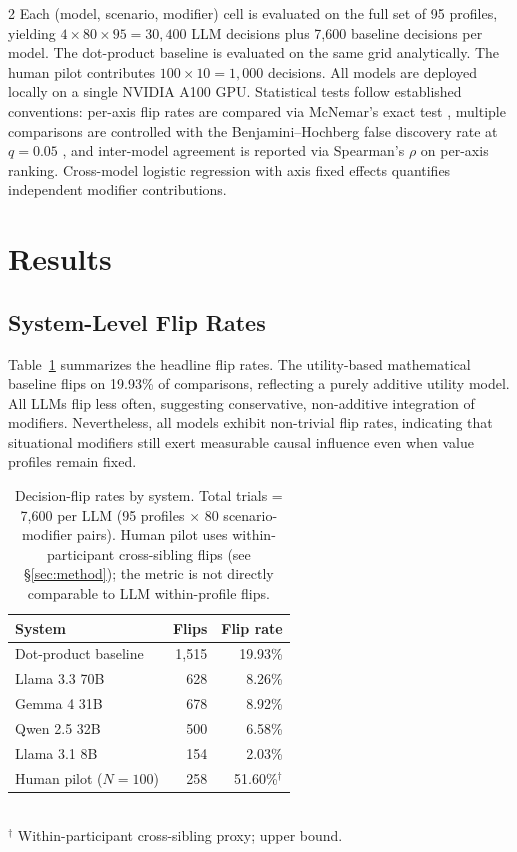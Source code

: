 \documentclass[11pt]{article}
\begin{document}
\begin{multicols}{2}
Each (model, scenario, modifier) cell is evaluated on the full set of 95 profiles, yielding $4\times80\times95 = 30{,}400$ LLM decisions plus 7{,}600 baseline decisions per model. The dot-product baseline is evaluated on the same grid analytically. The human pilot contributes $100\times10 = 1{,}000$ decisions. All models are deployed locally on a single NVIDIA A100 GPU. Statistical tests follow established conventions: per-axis flip rates are compared via McNemar's exact test \citep{mcnemar1947note}, multiple comparisons are controlled with the Benjamini--Hochberg false discovery rate at $q=0.05$ \citep{benjamini1995controlling}, and inter-model agreement is reported via Spearman's $\rho$ on per-axis ranking. Cross-model logistic regression with axis fixed effects quantifies independent modifier contributions.

\section{Results}
\label{sec:results}

\subsection{System-Level Flip Rates}

Table~\ref{tab:flip_rates} summarizes the headline flip rates. The utility-based mathematical baseline flips on 19.93\% of comparisons, reflecting a purely additive utility model. All LLMs flip less often, suggesting conservative, non-additive integration of modifiers. Nevertheless, all models exhibit non-trivial flip rates, indicating that situational modifiers still exert measurable causal influence even when value profiles remain fixed.

\begin{table}[H]
\centering\small
\caption{Decision-flip rates by system. Total trials = 7{,}600 per LLM (95 profiles $\times$ 80 scenario-modifier pairs). Human pilot uses within-participant cross-sibling flips (see \S\ref{sec:method}); the metric is not directly comparable to LLM within-profile flips.}
\label{tab:flip_rates}
\begin{tabular}{lrr}
\toprule
\textbf{System} & \textbf{Flips} & \textbf{Flip rate} \\
\midrule
Dot-product baseline   & 1{,}515 & 19.93\% \\
\midrule
Llama 3.3 70B          &   628   & ~8.26\% \\
Gemma 4 31B            &   678   & ~8.92\% \\
Qwen 2.5 32B           &   500   & ~6.58\% \\
Llama 3.1 8B           &   154   & ~2.03\% \\
\midrule
Human pilot ($N=100$)  &   258   & 51.60\%$^\dagger$ \\
\bottomrule
\end{tabular}\\[2pt]
\footnotesize{$^\dagger$ Within-participant cross-sibling proxy; upper bound.}
\end{table}


\end{multicols}
\end{document}
